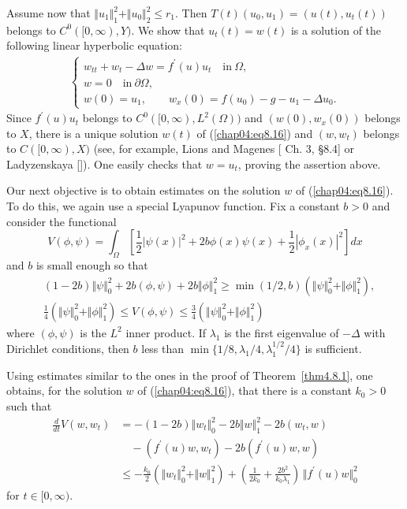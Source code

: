 \documentclass{surv-l}
\theoremstyle{plain}
\theoremstyle{definition}
\numberwithin{equation}{section}
\numberwithin{figure}{chapter}
\begin{document}
Assume now that $\Vert u_{1}\Vert_{1}^{2}+\Vert u_{0}\Vert_{2}^{2}\leq r_{1}$. Then $T(t)(u_{0}, u_{1})=(u(t), u_{t}(t))$ belongs to $C^{0}([0, \infty), Y)$. We show that $u_{t}(t)=w(t)$ is a solution of the following linear hyperbolic equation:
\begin{align}\label{chap04:eq8.16}
\left\{\begin{array}{l}
w_{tt}+w_{t}-\Delta w=f^{\prime}(u)u_{t}\quad \mathrm{in}\ \Omega,\\
w=0\quad \mathrm{in}\ \partial\Omega,\\
w(0)=u_{1},\qquad w_{x}(0)=f(u_{0})-g-u_{1}-\Delta u_{0}.
\end{array}\right.
\end{align}
Since $f^{\prime}(u)u_{t}$ belongs to $C^{0}([0, \infty), L^{2}(\Omega))$ and $(w(0), w_{x}(0))$ belongs to $X$, there is a unique solution $w(t)$ of (\ref{chap04:eq8.16}) and $(w, w_{t})$ belongs to $C([0, \infty), X)$ (see, for example, Lions and Magenes [\citeyear{1968lm} Ch. 3, \S 8.4] or Ladyzenskaya [\citeyear{1985l}]). One easily checks that $w=u_{t}$, proving the assertion above.

Our next objective is to obtain estimates on the solution $w$ of (\ref{chap04:eq8.16}). To do this, we again use a special Lyapunov function. Fix a constant $b>0$ and consider the functional
\begin{equation*}
V(\phi, \psi)=\int_{\Omega}\left[\frac{1}{2}|\psi(x)|^{2}+2b\phi(x)\psi(x)+\frac{1}{2}|\phi_{x}(x)|^{2}\right]dx
\end{equation*}
and $b$ is small enough so that
\begin{equation}\label{chap04:eq8.17}
\begin{split}
&(1-2b)\Vert\psi\Vert_{0}^{2}+2b(\phi, \psi)+2b\Vert\phi\Vert_{1}^{2}\geq\min(1/2, b)(\Vert\psi\Vert_{0}^{2}+\Vert\phi\Vert_{1}^{2}),\\
&\frac{1}{4}(\Vert\psi\Vert_{0}^{2}+\Vert\phi\Vert_{1}^{2})\leq V(\phi, \psi)\leq\frac{3}{4}(\Vert\psi\Vert_{0}^{2}+\Vert\phi\Vert_{1}^{2})
\end{split}
\end{equation}
where $(\phi, \psi)$ is the $L^{2}$ inner product. If $\lambda_{1}$ is the first eigenvalue of $-\Delta$ with Dirichlet conditions, then $b$ less than $\min\{1/8, \lambda_{1}/4, \lambda_{1}^{1/2}/4\}$ is sufficient.

Using estimates similar to the ones in the proof of Theorem~\ref{thm4.8.1}, one obtains, for the solution $w$ of (\ref{chap04:eq8.16}), that there is a constant $k_{0}>0$ such that
\begin{equation}\label{chap04:eq8.18}
\begin{split}
\frac{d}{dt}V(w, w_{t})&=-(1-2b)\Vert w_{t}\Vert_{0}^{2}-2b\Vert w\Vert_{1}^{2}-2b(w_{t}, w)\\
&\quad-(f^{\prime}(u)w, w_{t})-2b(f^{\prime}(u)w, w)\\
\qquad&\leq-\frac{k_{0}}{2}(\Vert w_{t}\Vert_{0}^{2}+\Vert w\Vert_{1}^{2})+\left(\frac{1}{2k_{0}}+\frac{2b^{2}}{k_{0}\lambda_{1}}\right)\,\Vert f^{\prime}(u)w\Vert_{0}^{2}
\end{split}
\end{equation}
for $t\in[0, \infty)$.
\end{document}
